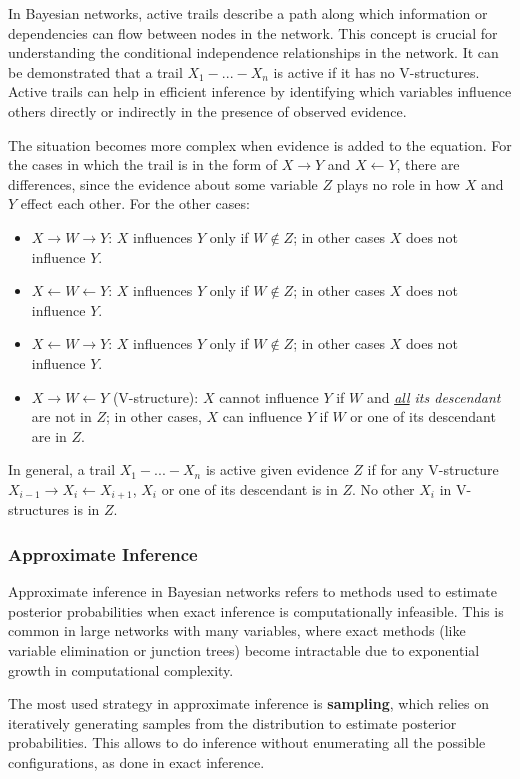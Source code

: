 \documentclass{article}
\begin{document}
\noindent
In Bayesian networks, active trails describe a path along which information or dependencies can flow between nodes in the network. This concept is crucial for understanding the conditional independence relationships in the network. It can be demonstrated that a trail $X_1-...-X_n$ is active if it has no V-structures. Active trails can help in efficient inference by identifying which variables influence others directly or indirectly in the presence of observed evidence.

The situation becomes more complex when evidence is added to the equation. For the cases in which the trail is in the form of $X \rightarrow Y$ and $X \leftarrow Y$, there are differences, since the evidence about some variable $Z$ plays no role in how $X$ and $Y$ effect each other. For the other cases:
\begin{itemize}
    \item $X \rightarrow W \rightarrow Y$: $X$ influences $Y$ only if $W\notin Z$; in other cases $X$ does not influence $Y$.
    \item $X \leftarrow W \leftarrow Y$: $X$ influences $Y$ only if $W\notin Z$; in other cases $X$ does not influence $Y$.
    \item $X \leftarrow W \rightarrow Y$: $X$ influences $Y$ only if $W\notin Z$; in other cases $X$ does not influence $Y$.
    \item $X \rightarrow W \leftarrow Y$ (V-structure): $X$ cannot influence $Y$ if $W$ and \textit{\underline{all} its descendant} are not in $Z$; in other cases, $X$ can influence $Y$ if $W$ or one of its descendant are in $Z$.
\end{itemize}

\noindent
In general, a trail $X_1-...-X_n$ is active given evidence $Z$ if for any V-structure $X_{i-1}\rightarrow X_i \leftarrow X_{i+1}$, $X_i$ or one of its descendant is in $Z$. No other $X_i$ in V-structures is in $Z$.

\subsubsection{Approximate Inference}
Approximate inference in Bayesian networks refers to methods used to estimate posterior probabilities when exact inference is computationally infeasible. This is common in large networks with many variables, where exact methods (like variable elimination or junction trees) become intractable due to exponential growth in computational complexity.

The most used strategy in approximate inference is \textbf{sampling}, which relies on iteratively generating samples from the distribution to estimate posterior probabilities. This allows to do inference without enumerating all the possible configurations, as done in exact inference.
\end{document}
